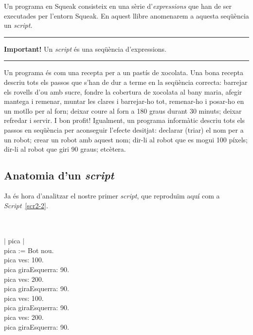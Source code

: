Un programa en Squeak consisteix en una sèrie d'\emph{expressions} que han de ser executades per l'entorn Squeak. En aquest llibre anomenarem a aquesta seqüència un \emph{script}.

\vspace{3mm}
\noindent
\rule{\textwidth}{2pt}
\noindent
\textbf{Important!} Un \emph{script} és una seqüència d'expressions.\\
\noindent
\rule{\textwidth}{2pt}
\vspace{3mm}

Un programa és com una recepta per a un pastís de xocolata. Una bona recepta descriu tots els passos que s'han de dur a terme en la seqüència correcta: barrejar els rovells d'ou amb sucre, fondre la cobertura de xocolata al bany maria, afegir mantega i remenar, muntar les clares i barrejar-ho tot, remenar-ho i posar-ho en un motllo per al forn; deixar coure al forn a 180 graus durant 30 minuts; deixar refredar i servir. I bon profit! Igualment, un programa informàtic descriu tots els passos en seqüència per aconseguir l'efecte desitjat: declarar (triar) el nom per a un robot; crear un robot amb aquest nom; dir-li al robot que es mogui 100 píxels; dir-li al robot que giri 90 graus; etcètera.

\subsection{Anatomia d'un \emph{script}}
Ja és hora d'analitzar el nostre primer \emph{script}, que reproduïm aquí com a \emph{Script}~\ref{scr2-2}.

\begin{script} 
\noindent
\textsf{\upshape
\\
\\$|$ pica $|$\\
pica := Bot nou.\\
pica ves: 100.\\
pica giraEsquerra: 90.\\
pica ves: 200.\\
pica giraEsquerra: 90.\\
pica ves: 100.\\
pica giraEsquerra: 90.\\
pica ves: 200.\\
pica giraEsquerra: 90.\\
}
\label{scr2-2}
\end{script}

